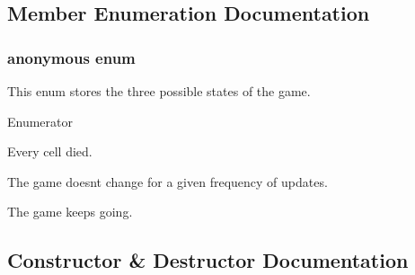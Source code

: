 \subsection{Member Enumeration Documentation}
\subsubsection[{anonymous enum}]{\setlength{\rightskip}{0pt plus 5cm}anonymous enum}\hypertarget{classGameOfLife_ab9119586dc592398cd982530e3076831}{}\label{classGameOfLife_ab9119586dc592398cd982530e3076831}


This enum stores the three possible states of the game. 

\begin{Desc}
\item[Enumerator]\par
\begin{description}
\item[{\em 
E\+X\+T\+I\+N\+CT\hypertarget{classGameOfLife_ab9119586dc592398cd982530e3076831aa42b4c2d9a4b12ea3bf81060bc781e43}{}\label{classGameOfLife_ab9119586dc592398cd982530e3076831aa42b4c2d9a4b12ea3bf81060bc781e43}
}]Every cell died. \item[{\em 
S\+T\+A\+B\+LE\hypertarget{classGameOfLife_ab9119586dc592398cd982530e3076831afcc170e6cce7f91ad0995193873ef5a7}{}\label{classGameOfLife_ab9119586dc592398cd982530e3076831afcc170e6cce7f91ad0995193873ef5a7}
}]The game doesn\textquotesingle{}t change for a given frequency of updates. \item[{\em 
N\+O\+R\+M\+AL\hypertarget{classGameOfLife_ab9119586dc592398cd982530e3076831adb669df0cff6f0440837322bfc241081}{}\label{classGameOfLife_ab9119586dc592398cd982530e3076831adb669df0cff6f0440837322bfc241081}
}]The game keeps going. \end{description}
\end{Desc}


\subsection{Constructor \& Destructor Documentation}
